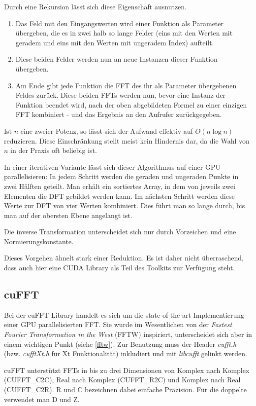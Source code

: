		Durch eine Rekursion lässt sich diese Eigenschaft ausnutzen.
		\begin{enumerate}
		    \item Das Feld mit den Eingangswerten wird einer Funktion als Parameter übergeben, die es in zwei halb so lange Felder (eins mit den Werten mit geradem und eins mit den Werten mit ungeradem Index) aufteilt.
			\item Diese beiden Felder werden nun an neue Instanzen dieser Funktion übergeben.
			\item Am Ende gibt jede Funktion die FFT des ihr als Parameter übergebenen Feldes zurück. Diese beiden FFTs werden nun, bevor eine Instanz der Funktion beendet wird, nach der oben abgebildeten Formel zu einer einzigen FFT kombiniert - und das Ergebnis an den Aufrufer zurückgegeben.
		\end{enumerate}
		Ist $n$ eine zweier-Potenz, so lässt sich der Aufwand effektiv auf $O(n\log n)$ reduzieren. Diese Einschränkung stellt meist kein Hindernis dar, da die Wahl von $n$ in der Praxis oft beliebig ist.
		
		In einer iterativen Variante lässt sich dieser Algorithmus auf einer GPU parallelisieren: In jedem Schritt werden die geraden und ungeraden Punkte in zwei Hälften geteilt. Man erhält ein sortiertes Array, in dem von jeweils zwei Elementen die DFT gebildet werden kann. Im nächsten Schritt werden diese Werte zur DFT von vier Werten kombiniert. Dies führt man so lange durch, bis man auf der obersten Ebene angelangt ist. 
		
		Die inverse Transformation unterscheidet sich nur durch Vorzeichen und eine Normierungskonstante.
		
		Dieses Vorgehen ähnelt stark einer Reduktion. Es ist daher nicht überraschend, dass auch hier eine CUDA Library als Teil des Toolkits zur Verfügung steht.
		
		\subsection{cuFFT}
		Bei der cuFFT Library handelt es sich um die state-of-the-art Implementierung einer GPU parallelisierten FFT. Sie wurde im Wesentlichen von der \textit{Fastest Fourier Transformation in the West} (FFTW) inspiriert, unterscheidet sich aber in einem wichtigen Punkt (siehe \ref{fftw}). Zur Benutzung muss der Header \textit{cufft.h} (bzw. \textit{cufftXt.h} für Xt Funktionalität) inkludiert und mit \textit{libcufft} gelinkt werden.
		
		cuFFT unterstützt FFTs in bis zu drei Dimensionen von Komplex nach Komplex (CUFFT{\_}C2C), Real nach Komplex (CUFFT{\_}R2C) und Komplex nach Real (CUFFT{\_}C2R). R und C bezeichnen dabei einfache Präzision. Für die doppelte verwendet man D und Z.
	
